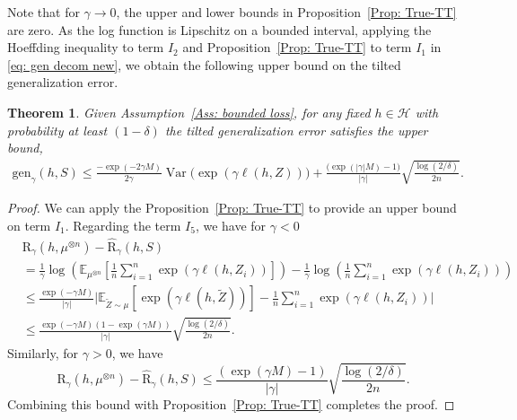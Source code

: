 \documentclass{article}
\theoremstyle{plain}
\theoremstyle{plain}
\newtheorem{theorem}{Theorem}[section]
\theoremstyle{definition}
\theoremstyle{remark}
\newcommand{\RTERM}{\widehat{\mathrm{R}}_{\gamma}}
\newcommand{\RTET}{\mathrm{R}_{\gamma}}
\newcommand{\mbE}{\mathbb{E}}
\begin{document}
Note that for $\gamma\rightarrow 0$, the upper and lower bounds in Proposition~\ref{Prop: True-TT} are zero. As the log function is Lipschitz on a bounded interval, applying the Hoeffding inequality to term $I_2$ and Proposition~\ref{Prop: True-TT} to term $I_1$ in \eqref{eq: gen decom new}, we obtain the following upper bound on the tilted generalization error.

\begin{tcolorbox}
    \begin{theorem}\label{thm: uniform hofed}
    Given Assumption~\ref{Ass: bounded loss}, for any fixed $h\in\mathcal{H}$ with probability at least $(1-\delta)$ the tilted generalization error satisfies the upper bound,     
    \begin{equation}
        \begin{split}
          \mathrm{gen}_{\gamma}(h,S)\leq \frac{-\exp(-2\gamma M)}{2\gamma}\operatorname{Var}\big(\exp(\gamma \ell (h,Z))\big) + \frac{\big(\exp(|\gamma|M)-1\big)} {|\gamma|}\sqrt{\frac{\log(2/\delta)}{2n}}.
        \end{split}
    \end{equation}
\end{theorem}
\end{tcolorbox}

\begin{proof}
    We can apply the Proposition~\ref{Prop: True-TT} to provide an upper bound on term $I_1$. Regarding the term $I_5$, we have for $\gamma<0$
    \begin{equation}\label{eq: uniform 2nd}
        \begin{split}
            &\RTET(h,\mu^{\otimes n})-\RTERM(h,S)\\
            &=\frac{1}{\gamma}\log(\mbE_{\mu^{\otimes n}}[\frac{1}{n}\sum_{i=1}^n \exp(\gamma \ell(h,Z_i))])-\frac{1}{\gamma}\log(\frac{1}{n}\sum_{i=1}^n \exp(\gamma \ell(h,Z_i)))\\
            &\leq \frac{\exp(-\gamma M)}{|\gamma|}\big|\mbE_{\tilde Z \sim \mu}[\exp(\gamma \ell(h,\tilde Z))]- \frac{1}{n}\sum_{i=1}^n \exp(\gamma \ell(h,Z_i)) \big|\\
            &\leq\frac{\exp(-\gamma M)(1-\exp(\gamma M))}{|\gamma|}\sqrt{\frac{\log(2/\delta)}{2n}}.
        \end{split}
    \end{equation}
  Similarly, for $\gamma>0$, we have 
  \begin{equation}
      \RTET(h,\mu^{\otimes n})-\RTERM(h,S)\leq \frac{(\exp(\gamma M)-1)}{|\gamma|}\sqrt{\frac{\log(2/\delta)}{2n}}.
  \end{equation}
  Combining this bound with Proposition~\ref{Prop: True-TT} completes the proof.
\end{proof}
\end{document}
